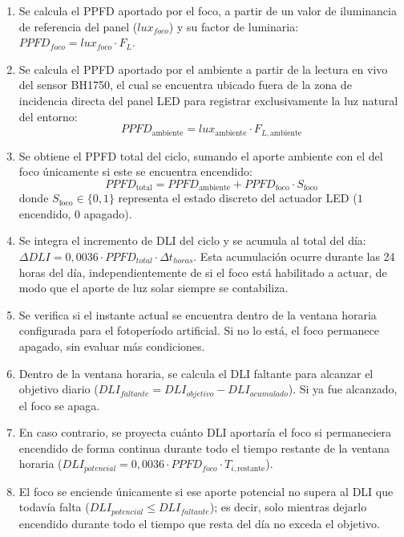 \begin{enumerate}
    \item Se calcula el PPFD aportado por el foco, a partir de un valor de iluminancia de referencia del panel ($lux_{foco}$) y su factor de luminaria: $PPFD_{foco} = lux_{foco} \cdot F_L$.
    \item Se calcula el PPFD aportado por el ambiente a partir de la lectura en vivo del sensor BH1750, el cual se encuentra ubicado fuera de la zona de incidencia directa del panel LED para registrar exclusivamente la luz natural del entorno: 
        \begin{equation}
        PPFD_{\text{ambiente}} = lux_{\text{ambiente}} \cdot F_{L,\text{ambiente}}
        \end{equation}
    \item Se obtiene el PPFD total del ciclo, sumando el aporte ambiente con el del foco únicamente si este se encuentra encendido:
        \begin{equation}
        PPFD_{\text{total}} = PPFD_{\text{ambiente}} + PPFD_{\text{foco}} \cdot S_{\text{foco}}
        \end{equation}
        donde $S_{\text{foco}} \in \{0, 1\}$ representa el estado discreto del actuador LED ($1$ encendido, $0$ apagado).
    \item Se integra el incremento de DLI del ciclo y se acumula al total del día: $\Delta DLI = 0{,}0036 \cdot PPFD_{total} \cdot \Delta t_{horas}$. Esta acumulación ocurre durante las 24 horas del día, independientemente de si el foco está habilitado a actuar, de modo que el aporte de luz solar siempre se contabiliza.
    \item Se verifica si el instante actual se encuentra dentro de la ventana horaria configurada para el fotoperíodo artificial. Si no lo está, el foco permanece apagado, sin evaluar más condiciones.
    \item Dentro de la ventana horaria, se calcula el DLI faltante para alcanzar el objetivo diario ($DLI_{faltante} = DLI_{objetivo} - DLI_{acumulado}$). Si ya fue alcanzado, el foco se apaga.
    \item En caso contrario, se proyecta cuánto DLI aportaría el foco si permaneciera encendido de forma continua durante todo el tiempo restante de la ventana horaria ($DLI_{potencial} = 0{,}0036 \cdot PPFD_{foco} \cdot T_{i,\text{restante}}$).
    \item El foco se enciende únicamente si ese aporte potencial no supera al DLI que todavía falta ($DLI_{potencial} \leq DLI_{faltante}$); es decir, solo mientras dejarlo encendido durante todo el tiempo que resta del día no exceda el objetivo.
\end{enumerate}

